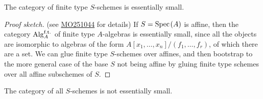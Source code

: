 \begin{theorem}\label{thm:finite-type-schemes-essentially-small} 
The category of finite type $S$-schemes is essentially small.
\end{theorem}
\begin{proof}[Proof sketch] (see \href{https://mathoverflow.net/a/251044}{MO251044} for details) If $S = \text{Spec}\hspace{0.1em}(A)$ is affine, then the category $\mathrm{Alg}_A^{\text{f.t.}}$ of finite type $A$-algebras is essentially small, since all the objects are isomorphic to algebras of the form $A[x_1, \ldots, x_n]/(f_1, \ldots, f_r)$, of which there are a set. We can glue finite type $S$-schemes over affines, and then bootstrap to the more general case of the base $S$ not being affine by gluing finite type schemes over all affine subschemes of $S$.
\end{proof}

\begin{remark} The category of all $S$-schemes is not essentially small.
\end{remark}


